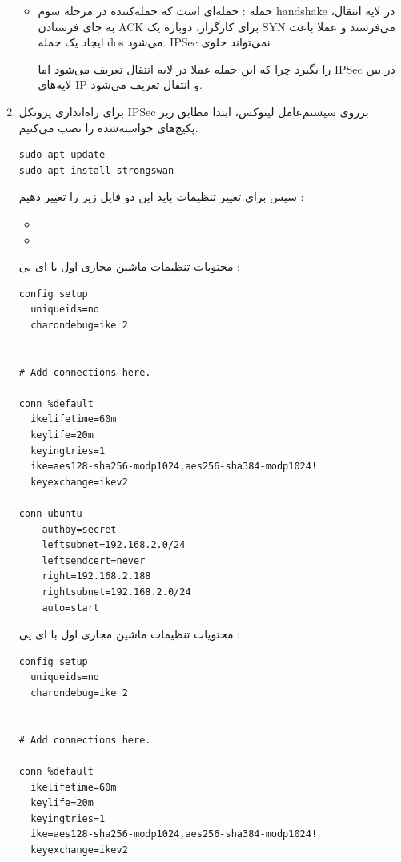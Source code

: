 \begin{enumerate}[label=\alph*)]
\begin{itemize}
      \item حمله  : 
      حمله‌ای است که حمله‌کننده در مرحله سوم handshake در لایه انتقال،‌ به جای فرستادن 
      ACK برای کارگزار،‌ دوباره یک SYN می‌فرستد و عملا 
      باعث ایجاد یک حمله dos می‌شود. IPSec 
      نمی‌تواند جلوی 


      را بگیرد چرا که این حمله عملا در لایه انتقال تعریف می‌شود اما 
      IPSec در بین لایه‌های IP و انتقال تعریف می‌شود.
      

    \end{itemize}

\item 
برای راه‌اندازی پروتکل IPSec 
برروی سیستم‌عامل لینوکس، ابتدا مطابق زیر پکیج‌های خواسته‌شده را 
نصب می‌کنیم.
\begin{latin}
  \begin{lstlisting}
sudo apt update
sudo apt install strongswan
\end{lstlisting}
\end{latin}
سپس برای تغییر تنظیمات باید این دو فایل زیر را تغییر دهیم : 
\begin{itemize}
  \item {}
  \item {}
\end{itemize}
محتویات تنظیمات ماشین مجازی اول با ای پی 
\textbf{} : 
\begin{latin}
  \begin{lstlisting}
config setup
  uniqueids=no
  charondebug=ike 2


# Add connections here.

conn %default
  ikelifetime=60m
  keylife=20m
  keyingtries=1
  ike=aes128-sha256-modp1024,aes256-sha384-modp1024!
  keyexchange=ikev2

conn ubuntu
    authby=secret
    leftsubnet=192.168.2.0/24
    leftsendcert=never
    right=192.168.2.188
    rightsubnet=192.168.2.0/24
    auto=start
\end{lstlisting}
\end{latin}
محتویات تنظیمات ماشین مجازی اول با ای پی 
\textbf{} : 
\begin{latin}
  \begin{lstlisting}
config setup
  uniqueids=no
  charondebug=ike 2


# Add connections here.

conn %default
  ikelifetime=60m
  keylife=20m
  keyingtries=1
  ike=aes128-sha256-modp1024,aes256-sha384-modp1024!
  keyexchange=ikev2


\end{lstlisting}
\end{latin}
\end{enumerate}
